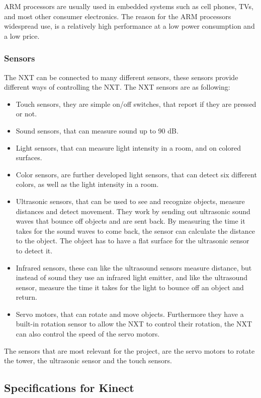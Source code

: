 ARM processors are usually used in embedded systems such as cell phones, TVs, and most other consumer electronics. The reason for the ARM processors widespread use, is a relatively high performance at a low power consumption and a low price.

\subsubsection{Sensors}
The NXT can be connected to many different sensors, these sensors provide different ways of controlling the NXT.
The NXT sensors are as following\cite{nxtspec}:

\begin{itemize}
\item Touch sensors, they are simple on/off switches, that report if they are pressed or not.
\item Sound sensors, that can measure sound up to 90 dB.
\item Light sensors, that can measure light intensity in a room, and on colored surfaces.
\item Color sensors, are further developed light sensors, that can detect six different colors, as well as the light intensity in a room.
\item Ultrasonic sensors, that can be used to see and recognize objects, measure distances and detect movement. They work by sending out ultrasonic sound waves that bounce off objects and are sent back. By measuring the time it takes for the sound waves to come back, the sensor can calculate the distance to the object. The object has to have a flat surface for the ultrasonic sensor to detect it.
\item Infrared sensors, these can like the ultrasound sensors measure distance, but instead of sound they use an infrared light emitter, and like the ultrasound sensor, measure the time it takes for the light to bounce off an object and return.
\item Servo motors, that can rotate and move objects. Furthermore they have a built-in rotation sensor to allow the NXT to control their rotation, the NXT can also control the speed of the servo motors.
\end{itemize}

The sensors that are most relevant for the project, are the servo motors to rotate the tower, the ultrasonic sensor and the touch sensors.

\subsection{Specifications for Kinect}

